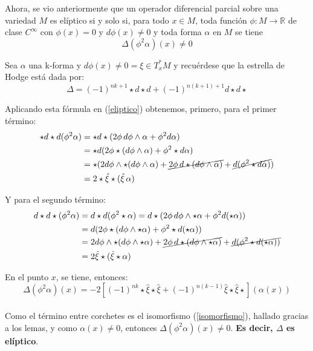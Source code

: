 Ahora, se vio anteriormente que un operador diferencial parcial sobre una variedad $M$ es elíptico si y solo si, para todo $x \in M$, toda función $\phi\colon M \to \mathbb{R}$ de clase $C^\infty$ con $\phi(x) = 0$ y $d\phi(x) \neq 0$ y toda forma $\alpha$ en $M$ se tiene
\begin{equation}
\label{eliptico}
    \Delta(\phi^2\alpha)(x) \neq 0
\end{equation}

Sea $\alpha$ una k-forma y $d\phi(x) \neq 0 = \xi \in T^*_xM$ y recuérdese que la estrella de Hodge está dada por:
\[\Delta  = (-1)^{nk+1}\star d \star d + (-1)^{n(k+1)+1}d\star d\star \]

Aplicando esta fórmula en (\ref{eliptico}) obtenemos, primero, para el primer término:
\begin{align*}
\star d\star d(\phi^2 \alpha) &= \star d\star (2\phi\, d\phi\wedge \alpha + \phi^2 d\alpha) \\ 
&= \star d (2\phi \star (d\phi\wedge \alpha) + \phi^2 \star d\alpha) \\
&= \star (2d\phi \wedge \star (d\phi\wedge \alpha) + \cancel{2\phi\, d \star (d\phi\wedge \alpha)} + \cancel{d(\phi^2 \star d\alpha)})\\
&= 2\star \hat\xi \star (\hat\xi\,\alpha)
\end{align*}

Y para el segundo término:
\begin{align*}
d\star d\star(\phi^2 \alpha) &= d\star d(\phi^2 \star\alpha)
= d\star (2\phi\, d\phi\wedge \star\alpha + \phi^2 d(\star\alpha)) \\
&= d (2\phi \star (d\phi\wedge \star\alpha) + \phi^2 \star d(\star\alpha)) \\
&= 2d\phi \wedge \star (d\phi\wedge \star\alpha) + \cancel{2\phi\, d \star (d\phi\wedge \star\alpha)} + \cancel{d(\phi^2 \star d(\star\alpha))}\\
&= 2\hat\xi \star (\hat\xi \star\alpha)
\end{align*}

En el punto $x$, se tiene, entonces:
\begin{equation}
    \Delta(\phi^2\alpha)(x) = -2[(-1)^{nk}\star \hat\xi \star \hat\xi+(-1)^{n(k-1)}\hat\xi \star \hat\xi \star](\alpha(x))
\end{equation}
\\
Como el término entre corchetes es el isomorfismo (\ref{isomorfismo}), hallado gracias a los lemas, y como $\alpha(x) \neq 0$, entonces $\Delta(\phi^2\alpha)(x) \neq 0$. \textbf{Es decir, $\Delta$ es elíptico}.


